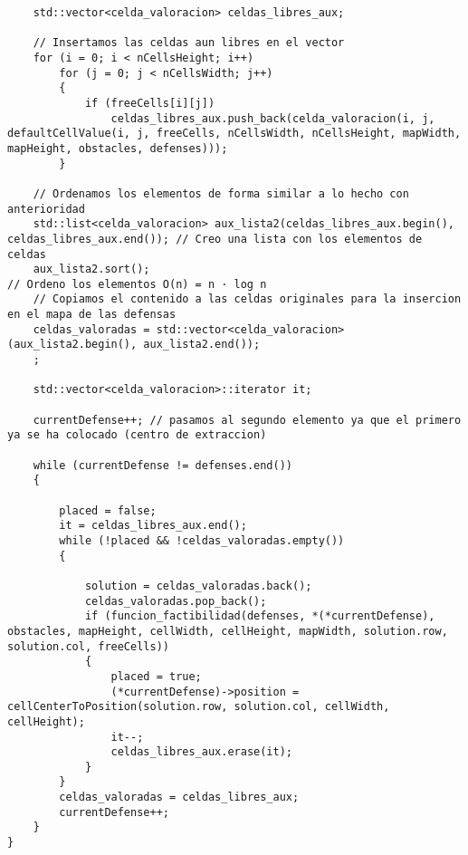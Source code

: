 \begin{lstlisting}
    std::vector<celda_valoracion> celdas_libres_aux;

    // Insertamos las celdas aun libres en el vector
    for (i = 0; i < nCellsHeight; i++)
        for (j = 0; j < nCellsWidth; j++)
        {
            if (freeCells[i][j])
                celdas_libres_aux.push_back(celda_valoracion(i, j, defaultCellValue(i, j, freeCells, nCellsWidth, nCellsHeight, mapWidth, mapHeight, obstacles, defenses)));
        }

    // Ordenamos los elementos de forma similar a lo hecho con anterioridad
    std::list<celda_valoracion> aux_lista2(celdas_libres_aux.begin(), celdas_libres_aux.end()); // Creo una lista con los elementos de celdas
    aux_lista2.sort();                                                                          // Ordeno los elementos O(n) = n · log n
    // Copiamos el contenido a las celdas originales para la insercion en el mapa de las defensas
    celdas_valoradas = std::vector<celda_valoracion>(aux_lista2.begin(), aux_lista2.end());
    ;

    std::vector<celda_valoracion>::iterator it;

    currentDefense++; // pasamos al segundo elemento ya que el primero ya se ha colocado (centro de extraccion)

    while (currentDefense != defenses.end())
    {

        placed = false;
        it = celdas_libres_aux.end();
        while (!placed && !celdas_valoradas.empty())
        {

            solution = celdas_valoradas.back();
            celdas_valoradas.pop_back();
            if (funcion_factibilidad(defenses, *(*currentDefense), obstacles, mapHeight, cellWidth, cellHeight, mapWidth, solution.row, solution.col, freeCells))
            {
                placed = true;
                (*currentDefense)->position = cellCenterToPosition(solution.row, solution.col, cellWidth, cellHeight);
                it--;
                celdas_libres_aux.erase(it);
            }
        }
        celdas_valoradas = celdas_libres_aux;
        currentDefense++;
    }
}
\end{lstlisting}